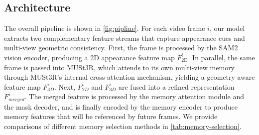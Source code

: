 

\vspace{-0.5em}
\subsection{Architecture}
\vspace{-0.5em}
The overall pipeline is shown in \cref{fig:pipline}.
For each video frame $i$, our model extracts two complementary feature streams that capture appearance cues and multi-view geometric consistency. 
First, the frame is processed by the SAM2 vision encoder, producing a 2D appearance feature map $F_{\mathrm{2D}}^{i}$. 
In parallel, the same frame is passed into MUSt3R, which attends to its own multi-view memory through MUSt3R's internal cross-attention mechanism, yielding a geometry-aware feature map $F_{{3D}}^{i}$. Next, $F_{{2D}}^{i}$ and $F_{{3D}}^{i}$ are fused into a refined representation $F_{{merged}}^{i}$. The merged feature is processed by the memory attention module and the mask decoder, and is finally encoded by the memory encoder to produce memory features that will be referenced by future frames. We provide comparisons of different memory selection methods in \cref{tab:memory-selection}.



